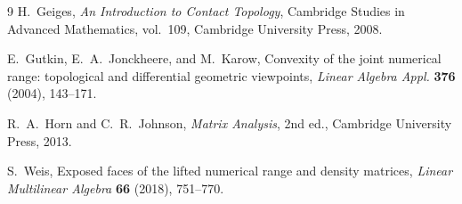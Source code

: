\documentclass[11pt,a4paper]{article}
\theoremstyle{definition}
\theoremstyle{remark}
\begin{document}
\begin{thebibliography}{9}
H.~Geiges, \emph{An Introduction to Contact Topology}, Cambridge Studies in Advanced Mathematics, vol.~109, Cambridge University Press, 2008.

E.~Gutkin, E.~A.~Jonckheere, and M.~Karow, Convexity of the joint numerical range: topological and differential geometric viewpoints, \emph{Linear Algebra Appl.} \textbf{376} (2004), 143--171.

R.~A.~Horn and C.~R.~Johnson, \emph{Matrix Analysis}, 2nd ed., Cambridge University Press, 2013.

S.~Weis, Exposed faces of the lifted numerical range and density matrices, \emph{Linear Multilinear Algebra} \textbf{66} (2018), 751--770.
\end{thebibliography}
\end{document}
